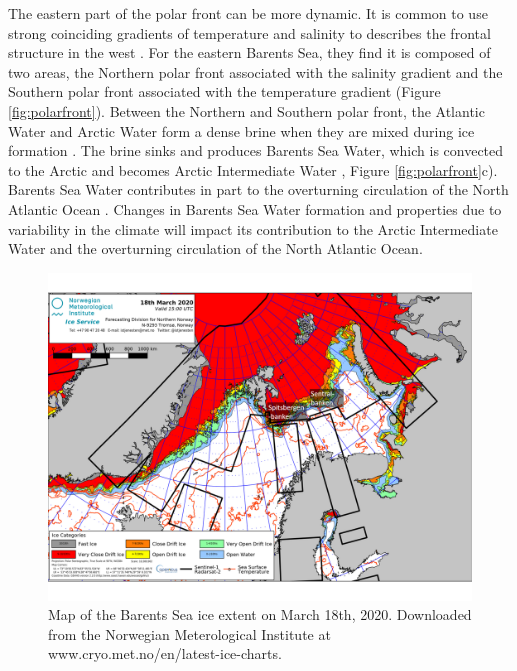 \documentclass[a4paper, 12pt, Ariel]{article}
\begin{document}
The eastern part of the polar front can be more dynamic. It is common to use strong coinciding gradients of temperature and salinity to describes the frontal structure in the west \cite{Skjoldal1987}. For the eastern Barents Sea, they find it is composed of two areas, the Northern polar front associated with the salinity gradient and the Southern polar front associated with the temperature gradient \cite{Oziel2016} (Figure \ref{fig:polarfront}). Between the Northern and Southern polar front, the Atlantic Water and Arctic Water form a dense brine when they are mixed during ice formation \cite{Pfirman1994}. The brine sinks and produces Barents Sea Water, which is convected to the Arctic and becomes Arctic Intermediate Water \cite{Rudels1994}, Figure \ref{fig:polarfront}c). Barents Sea Water contributes in part to the overturning circulation of the North Atlantic Ocean \cite{Oziel2016}. Changes in Barents Sea Water formation and properties due to variability in the climate will impact its contribution to the Arctic Intermediate Water and the overturning circulation of the North Atlantic Ocean.\\


\begin{figure}[H]
	\includegraphics[width=\textwidth]{IceExtent18032020.png}
	\caption{Map of the Barents Sea ice extent on March 18th, 2020. Downloaded from the Norwegian Meterological Institute at www.cryo.met.no/en/latest-ice-charts.}
	\label{fig:iceextent}
\end{figure}
\end{document}
